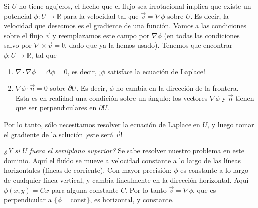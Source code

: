 \documentclass{article}
\newcommand{\realNumbers}{\mathbb{R}}
\begin{document}
  Si \(U\) no tiene agujeros, el hecho que el flujo sea irrotacional implica que existe un potencial \(\phi : U \rightarrow \realNumbers\) para la velocidad tal que \(\vec{v} = \nabla \phi\) sobre \(U\).
  Es decir, la velocidad que deseamos es el gradiente de una función.
  Vamos a las condiciones sobre el flujo \(\vec{v}\) y reemplazamos este campo por \(\nabla \phi\) (en todas las condiciones salvo por \(\nabla \times \vec{v} = 0\), dado que ya la hemos usado).
  Tenemos que encontrar \(\phi : U \rightarrow \realNumbers\), tal que
  \begin{enumerate}
    \item \(\nabla \cdot \nabla \phi = \Delta \phi = 0\), es decir, ¡\(\phi\) satisface la ecuación de Laplace!
    \item \(\nabla \phi \cdot \vec{n} = 0\) sobre \(\partial U\).
    Es decir, \(\phi\) no cambia en la dirección de la frontera.
    Esta es en realidad una condición sobre un ángulo: los vectores \(\nabla \phi\) y \(\vec{n}\) tienen que ser perpendiculares en \(\partial U\).
  \end{enumerate}
  Por lo tanto, sólo necesitamos resolver la ecuación de Laplace en \(U\), y luego tomar el gradiente de la solución
  ¡este será \(\vec{v}\)!

  \emph{¿Y si} \(U\) \emph{fuera el semiplano superior?}
  Se sabe resolver nuestro problema en este dominio.
  Aquí el fluído se mueve a velocidad constante a lo largo de las líneas horizontales (líneas de corriente).
  Con mayor precisión:
  \(\phi\) es constante a lo largo de cualquier línea vertical, y cambia linealmente en la dirección horizontal.
  Aquí \(\phi(x, y) = C x\) para alguna constante \(C\).
  Por lo tanto \(\vec{v} = \nabla \phi\), que es perpendicular a \(\{\phi = \text{const}\}\), es horizontal, y constante.
\end{document}
